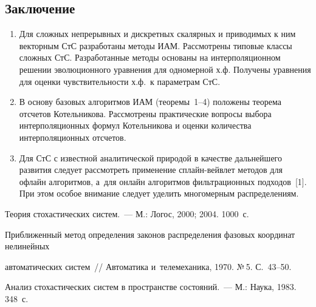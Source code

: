 \begin{multicols}{2}
\section{Заключение}

\vspace*{-2pt}


\noindent
\begin{enumerate}[5.1.]
\item Для сложных непрерывных и дискретных скалярных и приводимых к ним векторным 
СтС разработаны методы ИАМ. Рассмотрены типовые классы сложных СтС. Разработанные методы 
основаны на интерполяционном решении эволюционного уравнения для одномерной 
х.ф. Получены уравнения для оценки чувствительности х.ф.\ к параметрам СтС.
\item
 В основу базовых алгоритмов ИАМ (теоремы~1--4) положены 
теорема отсчетов Котельникова. Рассмотрены практические вопросы выбора 
интерполяционных формул Котельникова и оценки количества интерполяционных отсчетов.
\item
 Для СтС с известной аналитической природой в качестве 
дальнейшего развития следует рассмотреть применение сплайн-вейв\-лет методов
 для офлайн алгоритмов, а~для онлайн алгоритмов фильтрационных подходов~[1]. 
 При этом особое внимание следует уделить многомерным распределениям.
\end{enumerate}

\vspace*{-12pt}

{\small\frenchspacing
 {%
 \begin{thebibliography}{9}
 
 \vspace*{-2pt}


Теория стохастических систем.~--- М.: Логос, 2000; 2004. 1000~с.

Приближенный метод определения законов распределения фазовых координат 
нелинейных\linebreak\vspace*{-12pt}

\pagebreak

\noindent
 автоматических систем~// Автоматика и~телемеханика, 1970. №\,5. С.~43--50.

Анализ стохастических систем в пространстве состояний.~--- М.: Наука, 1983. 348~с.


\end{thebibliography}}}
\end{multicols}
